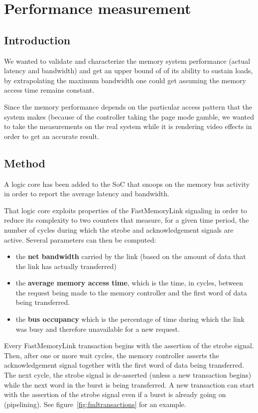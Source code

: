 \documentclass[a4paper,11pt]{kthesis}
\begin{document}
\section{Performance measurement}
\label{sec:memperf}
\subsection{Introduction}
We wanted to validate and characterize the memory system performance (actual latency and bandwidth) and get an upper bound of of its ability to sustain loads, by extrapolating the maximum bandwidth one could get assuming the memory access time remains constant.

Since the memory performance depends on the particular access pattern that the system makes (because of the controller taking the page mode gamble, we wanted to take the measurements on the real system while it is rendering video effects in order to get an accurate result.

\subsection{Method}
A logic core has been added to the SoC that snoops on the memory bus activity in order to report the average latency and bandwidth.

That logic core exploits properties of the FastMemoryLink signaling in order to reduce its complexity to two counters that measure, for a given time period, the number of cycles during which the strobe and acknowledgement signals are active. Several parameters can then be computed:
\begin{itemize}
\item the \textbf{net bandwidth} carried by the link (based on the amount of data that the link has actually transferred)
\item the \textbf{average memory access time}, which is the time, in cycles, between the request being made to the memory controller and the first word of data being transferred.
\item the \textbf{bus occupancy} which is the percentage of time during which the link was busy and therefore unavailable for a new request.
\end{itemize}

Every FastMemoryLink transaction begins with the assertion of the strobe signal. Then, after one or more wait cycles, the memory controller asserts the acknowledgement signal together with the first word of data being transferred. The next cycle, the strobe signal is de-asserted (unless a new transaction begins) while the next word in the burst is being transferred. A new transaction can start with the assertion of the strobe signal even if a burst is already going on (pipelining). See figure~\ref{fig:fmltransactions} for an example.
\end{document}
